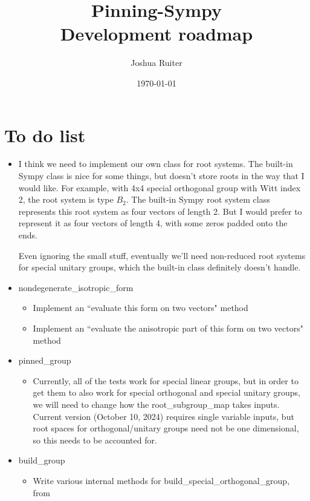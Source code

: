 \documentclass[12pt]{article}
\title{Pinning-Sympy \\
	Development roadmap}
\author{Joshua Ruiter}
\date{\today}
\begin{document}
\maketitle
\tableofcontents

\newpage

\section{To do list}

\begin{itemize}
	\item I think we need to implement our own class for root systems. The built-in Sympy class is nice for some things, but doesn't store roots in the way that I would like. For example, with 4x4 special orthogonal group with Witt index 2, the root system is type $B_2$. The built-in Sympy root system class represents this root system as four vectors of length 2. But I would prefer to represent it as four vectors of length 4, with some zeros padded onto the ends.

	Even ignoring the small stuff, eventually we'll need non-reduced root systems for special unitary groups, which the built-in class definitely doesn't handle.

	\item nondegenerate\_isotropic\_form
	\begin{itemize}
		\item Implement an ``evaluate this form on two vectors" method
		\item Implement an ``evaluate the anisotropic part of this form on two vectors" method
	\end{itemize}
	\item pinned\_group
	\begin{itemize}
		\item Currently, all of the tests work for special linear groups, but in order to get them to also work for special orthogonal and special unitary groups, we will need to change how the root\_subgroup\_map takes inputs. Current version (October 10, 2024) requires single variable inputs, but root spaces for orthogonal/unitary groups need not be one dimensional, so this needs to be accounted for.
	\end{itemize}
	\item build\_group
	\begin{itemize}
		\item Write various internal methods for build\_special\_orthogonal\_group, from 


\end{itemize}
\end{itemize}
\end{document}
